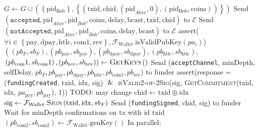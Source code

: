 \begin{algorithmic}[1]
        \EndIndent
      \EndIndent
        \State $G \leftarrow G \cup \left(\left\{\mathrm{pid_{Bob}}\right\},
        \left\{\left(\mathrm{txid}, \mathrm{chid}, \left(\mathrm{pid}_{Alice},
        0\right), \left(\mathrm{pid_{Bob}},
        \mathrm{coins}\right)\right)\right\}\right)$
        \State Send $\left(\mathtt{accepted}, \mathrm{pid}_{Alice},
        \mathrm{pid}_{Bob}, \mathrm{coins}, \mathrm{delay}, \mathrm{bcast},
        \mathrm{txid}, \mathrm{chid}\right)$
        \Indent
          \Indent
            \State to $\mathcal{E}$
          \EndIndent
        \EndIndent
      \Else
        \State Send $\left(\mathtt{notAccepted}, \mathrm{pid}_{Alice},
        \mathrm{pid}_{Bob}, \mathrm{coins}, \mathrm{delay},
        \mathrm{bcast}\right)$ to $\mathcal{E}$
      \EndIf
    \EndIndent
    \State
      \State assert($\forall i \in \left\{\mathrm{pay}, \mathrm{dpay},
      \mathrm{htlc}, \mathrm{com}1, \mathrm{rev}\right\},
      \mathcal{F}_{\mathrm{Wallet}}.\mathrm{isValidPubKey}\left(pa_i\right)$)
      \State $\left(\left(pb_F, sb_F\right), \left(pb_\mathrm{pay},
      sb_\mathrm{pay}\right), \left(pb_\mathrm{dpay}, sb_\mathrm{dpay}\right),
      \left(pb_\mathrm{htlc}, sb_\mathrm{htlc}\right),\right.$
      \State $\left.\left(pb_\mathrm{com}1, sb_\mathrm{com}1\right),
      \left(pb_\mathrm{rev}, sb_\mathrm{rev}\right)\right) \gets
      \textsc{GetKeys}\left(\right)$
      \State Send (\texttt{acceptChannel}, minDepth, selfDelay,
      \Indent
        \Indent
          \State $pb_F, pb_{\mathrm{pay}}, pb_{\mathrm{dpay}},
          pb_{\mathrm{htlc}}, pb_{\mathrm{com}1}, pb_{\mathrm{rev}}$) to funder
        \EndIndent
      \EndIndent
      \State assert(response = (\texttt{fundingCreated}, txid, idx, sig) $\And$
      \textsc{isValid2-of-2Sig}(sig, \textsc{GetCommitment}(txid, idx,
      $pa_{\mathrm{pay}}, pb_{\mathrm{pay}}$), 1)) TODO: may change
      \State $\mathrm{chid} \gets \mathrm{txid} \oplus \mathrm{idx}$
      \State $\mathrm{sig} \gets
      \mathcal{F}_{\mathrm{Wallet}}.\textsc{Sign}\left(\mathrm{txid},
      \mathrm{idx}, sb_F\right)$
      \State Send (\texttt{fundingSigned}, chid, sig) to funder
      \State Wait for minDepth confirmations on tx with id txid
      \State $\left(pb_{\mathrm{com}2}, sb_{\mathrm{com}2}\right) \gets
      \mathcal{F}_{\mathrm{Wallet}}.\mathrm{genKey}\left(\right)$
      \State In parallel:

\end{algorithmic}
